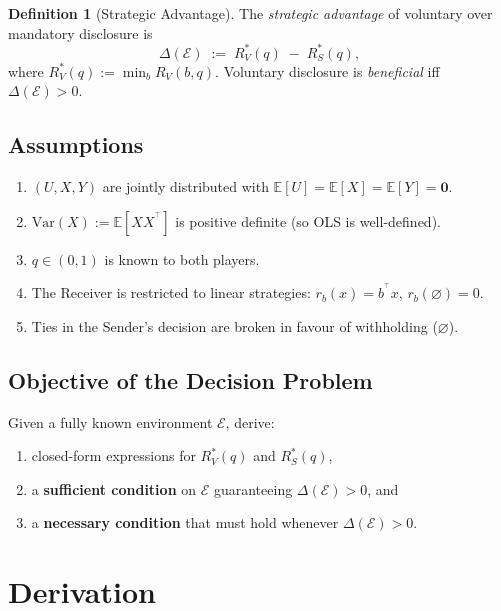 \documentclass[11pt]{article}
\theoremstyle{definition}
\newtheorem{definition}[theorem]{Definition}
\theoremstyle{remark}
\newcommand{\E}{\mathbb{E}}
\newcommand{\T}{^{\top}}
\begin{document}
\begin{definition}[Strategic Advantage]
  The \emph{strategic advantage} of voluntary over mandatory disclosure is
  \[
    \Delta(\mathcal{E})
    \;:=\;
    R_{V}^{*}(q) \;-\; R_{S}^{*}(q),
  \]
  where $R_{V}^{*}(q) := \min_{b} R_{V}(b,q)$.
  Voluntary disclosure is \emph{beneficial} iff $\Delta(\mathcal{E}) > 0$.
\end{definition}

\subsection{Assumptions}

\begin{enumerate}[label=\textbf{A\arabic*.}]
  \item $(U,X,Y)$ are jointly distributed with $\E[U]=\E[X]=\E[Y]=\mathbf{0}$.
  \item $\mathrm{Var}(X) := \E[XX^{\T}]$ is positive definite (so OLS is well-defined).
  \item $q \in (0,1)$ is known to both players.
  \item The Receiver is restricted to linear strategies:
        $r_{b}(x) = b^{\T}x$, $r_{b}(\varnothing)=0$.
  \item Ties in the Sender's decision are broken in favour of withholding ($\varnothing$).
\end{enumerate}

\subsection{Objective of the Decision Problem}

Given a fully known environment $\mathcal{E}$, derive:
\begin{enumerate}[label=(\roman*)]
  \item closed-form expressions for $R_{V}^{*}(q)$ and $R_{S}^{*}(q)$,
  \item a \textbf{sufficient condition} on $\mathcal{E}$ guaranteeing $\Delta(\mathcal{E})>0$, and
  \item a \textbf{necessary condition} that must hold whenever $\Delta(\mathcal{E})>0$.
\end{enumerate}

\section{Derivation}
\end{document}
